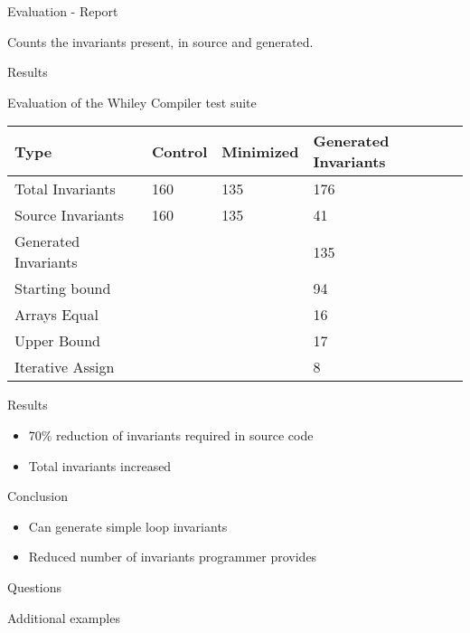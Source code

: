 \begin{frame}[fragile]{Evaluation - Report}

Counts the invariants present, in source and generated.

\end{frame}



\begin{frame}{Results}

Evaluation of the Whiley Compiler test suite

\begin{longtable}[]{@{}llll@{}}
\toprule
Type & Control & Minimized & Generated Invariants\tabularnewline
\midrule
\endhead
Total Invariants & 160 & 135 & 176\tabularnewline
Source Invariants & 160 & 135 & 41\tabularnewline
Generated Invariants & & & 135\tabularnewline
Starting bound & & & 94\tabularnewline
Arrays Equal & & & 16\tabularnewline
Upper Bound & & & 17\tabularnewline
Iterative Assign & & & 8\tabularnewline
\bottomrule
\end{longtable}

\end{frame}



\begin{frame}{Results}

\begin{itemize}
\item 70\% reduction of invariants required in source code
\item Total invariants increased
\end{itemize}

\end{frame}



\begin{frame}{Conclusion}

\begin{itemize}
\item Can generate simple loop invariants
\item Reduced number of invariants programmer provides
\end{itemize}

\end{frame}



\begin{frame}

\begin{center}
    \Huge{Questions}
\end{center}

\end{frame}



\begin{frame}{Additional examples}

\end{frame}


